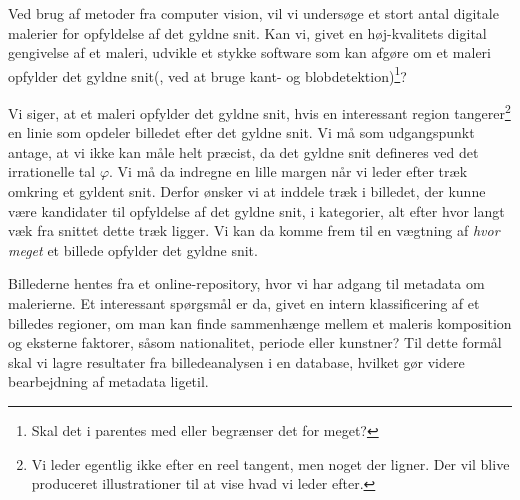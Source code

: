 Ved brug af metoder fra computer vision, vil vi undersøge et stort antal
digitale malerier for opfyldelse af det gyldne snit. Kan vi, givet en
høj-kvalitets digital gengivelse af et maleri, udvikle et stykke software som
kan afgøre om et maleri opfylder det gyldne snit(, ved at bruge kant- og
blobdetektion)\footnote{Skal det i parentes med eller begrænser det for
meget?}?

Vi siger, at et maleri opfylder det gyldne snit, hvis en interessant region
tangerer\footnote{Vi leder egentlig ikke efter en reel tangent, men noget der
ligner. Der vil blive produceret illustrationer til at vise hvad vi leder
efter.} en linie som opdeler billedet efter det gyldne snit. Vi må som
udgangspunkt antage, at vi ikke kan måle helt præcist, da det gyldne snit
defineres ved det irrationelle tal $\varphi$. Vi må da indregne en lille margen
når vi leder efter træk omkring et gyldent snit.  Derfor ønsker vi at inddele
træk i billedet, der kunne være kandidater til opfyldelse af det gyldne snit, i
kategorier, alt efter hvor langt væk fra snittet dette træk ligger. Vi kan da
komme frem til en vægtning af \emph{hvor meget} et billede opfylder det gyldne
snit.

Billederne hentes fra et online-repository, hvor vi har adgang til metadata om
malerierne. Et interessant spørgsmål er da, givet en intern klassificering af
et billedes regioner, om man kan finde sammenhænge mellem et maleris
komposition og eksterne faktorer, såsom nationalitet, periode eller kunstner?
Til dette formål skal vi lagre resultater fra billedeanalysen i en database,
hvilket gør videre bearbejdning af metadata ligetil.
